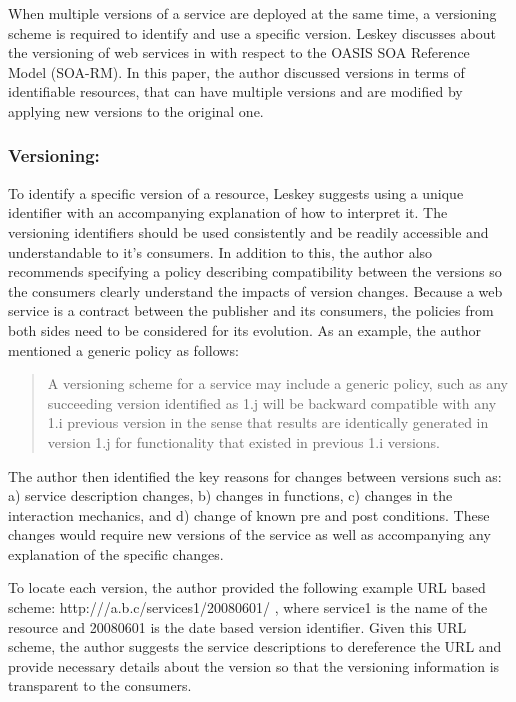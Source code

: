 \documentclass[runningheads,a4paper]{llncs}
\begin{document}
When multiple versions of a service are deployed at the same time, a versioning scheme is required to identify and use a specific version. Leskey discusses about the versioning of web services in \cite{laskey2008considerations} with respect to the OASIS SOA Reference Model (SOA-RM). In this paper, the author discussed versions in terms of identifiable resources, that can have multiple versions and are modified by applying new versions to the original one.

\subsubsection{Versioning:}
To identify a specific version of a resource, Leskey suggests using a unique identifier with an accompanying explanation of how to interpret it. The versioning identifiers should be used consistently and be readily accessible and understandable to it’s consumers. In addition to this, the author also recommends specifying a policy describing compatibility between the versions so the consumers clearly understand the impacts of version changes. Because a web service is a contract between the publisher and its consumers, the policies from both sides need to be considered for its evolution. As an example, the author mentioned a generic policy as follows:

\begin{quote}
  A versioning scheme for a service may include a generic policy, such as any succeeding version identified as 1.j will be backward compatible with any 1.i previous version in the sense that results are identically generated in version 1.j for functionality that existed in previous 1.i versions.
\end{quote}

The author then identified the key reasons for changes between versions such as: a) service description changes, b) changes in functions, c) changes in the interaction mechanics, and d) change of known pre and post conditions. These changes would require new versions of the service as well as accompanying any explanation of the specific changes.

To locate each version, the author provided the following example URL based scheme: http:///a.b.c/services1/20080601/ , where service1 is the name of the resource and 20080601 is the date based version identifier. Given this URL scheme, the author suggests the service descriptions to dereference the URL and provide necessary details about the version so that the versioning information is transparent to the consumers.
\end{document}
